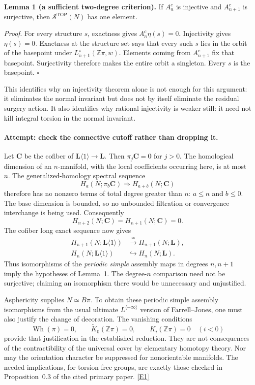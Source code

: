 \documentclass[11pt,a4paper]{article}
\newcommand{\Z}{\mathbb{Z}}
\newcommand{\eref}[2]{\hyperlink{extra:#1:#2}{[E#2]}}
\numberwithin{equation}{section}
\begin{document}
\textbf{Lemma 1 (a sufficient two-degree criterion).}
If $A^c_n$ is injective and $A^c_{n+1}$ is surjective, then
$\mathcal S^{\mathrm{TOP}}(N)$ has one element.

\emph{Proof.} For every structure $s$, exactness gives
$A^c_n\eta(s)=0$. Injectivity gives $\eta(s)=0$. Exactness at the
structure set says that every such $s$ lies in the orbit of the basepoint
under $L^s_{n+1}(\Z\pi,w)$. Elements coming from $A^c_{n+1}$ fix that
basepoint. Surjectivity therefore makes the entire orbit a singleton.
Every $s$ is the basepoint. $\square$

This identifies why an injectivity theorem alone is not enough for this
argument: it eliminates the normal invariant but does not by itself
eliminate the residual surgery action. It also identifies why rational
injectivity is weaker still: it need not kill integral torsion in the
normal invariant.

\paragraph{Attempt: check the connective cutoff rather than dropping it.}
Let $\mathbf C$ be the cofiber of
$\mathbf L\langle1\rangle\to\mathbf L$. Then
$\pi_j\mathbf C=0$ for $j>0$. The homological dimension of an
$n$-manifold, with the local coefficients occurring here, is at most $n$.
The generalized-homology spectral sequence
\[
 H_a(N;\pi_b\mathbf C)\Longrightarrow H_{a+b}(N;\mathbf C)
\]
therefore has no nonzero terms of total degree greater than $n$:
$a\leq n$ and $b\leq0$. The base dimension is bounded, so no unbounded
filtration or convergence interchange is being used. Consequently
\[
 H_{n+2}(N;\mathbf C)=H_{n+1}(N;\mathbf C)=0.
\]
The cofiber long exact sequence now gives
\begin{equation}\label{eq:30006734:comparison}
\begin{aligned}
 H_{n+1}(N;\mathbf L\langle1\rangle)&\xrightarrow{\ \simeq\ }
 H_{n+1}(N;\mathbf L),\\
 H_n(N;\mathbf L\langle1\rangle)&\hookrightarrow H_n(N;\mathbf L).
\end{aligned}
\end{equation}
Thus isomorphisms of the \emph{periodic simple} assembly maps in degrees
$n,n+1$ imply the hypotheses of Lemma~1. The degree-$n$ comparison need
not be surjective; claiming an isomorphism there would be unnecessary
and unjustified.

Asphericity supplies $N\simeq B\pi$. To obtain these periodic simple
assembly isomorphisms from the usual ultimate $L^{\langle-\infty\rangle}$
version of Farrell--Jones, one must also justify the change of decoration.
The vanishing conditions
\[
 \operatorname{Wh}(\pi)=0,\qquad
 \widetilde K_0(\Z\pi)=0,\qquad K_i(\Z\pi)=0\quad(i<0)
\]
provide that justification in the established reduction. They are not
consequences of the contractibility of the universal cover by elementary
homotopy theory. Nor may the orientation character be suppressed for
nonorientable manifolds. The needed implications, for torsion-free groups,
are exactly those checked in Proposition~0.3 of the cited primary paper.
\eref{30006734}{1}
\end{document}
